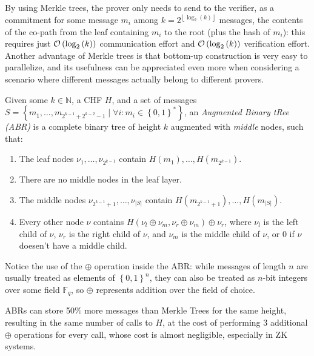 \noindent By using Merkle trees, the prover only needs to send to the verifier, as a commitment for
some message \(m_i\) among \(k = 2^{\left\lfloor\log_2(k)\right\rfloor}\) messages, the contents of
the co-path from the leaf containing \(m_i\) to the root (plus the hash of \(m_i\)): this requires
just \(\mathcal{O}\left(\log_2\left(k\right)\right)\) communication effort and
\(\mathcal{O}\left(\log_2\left(k\right)\right)\) verification effort.
Another advantage of Merkle trees is that bottom-up construction is very easy to parallelize,
and its usefulness can be appreciated even more when considering a scenario where different
messages actually belong to different provers.
\begin{definition}
	Given some \(k \in \mathbb{N}\), a CHF \(H\), and a set of messages
	\(S = \left\{m_1, \dots, m_{2^{k-1} + 2^{k-2}-1} \mid \forall i\colon m_i \in
	{\left\{0, 1\right\}}^*\right\} \),
	an \emph{Augmented Binary tRee (ABR)} is a complete binary tree of
	height \(k\) augmented with \emph{middle} nodes, such that:
	\begin{enumerate}
		\item The leaf nodes \(\nu_{1}, \dots, \nu_{2^{k-1}}\) contain \(H\left(m_1\right), \dots,
		      H\left(m_{2^{k-1}}\right)\).
		\item There are no middle nodes in the leaf layer.
		\item The middle nodes \(\nu_{2^{k-1}+1}, \dots, \nu_{\left|S\right|}\) contain
		      \(H\left(m_{2^{k-1}+1}\right), \dots, H\left(m_{\left|S\right|}\right)\).
		\item Every other node \(\nu \) contains \(H\left(\nu_l \oplus \nu_m, \nu_r \oplus
		      \nu_m\right) \oplus \nu_r \), where \(\nu_l\) is the left child of \(\nu \), \(\nu_r\)
		      is the right child of \(\nu \), and \(\nu_m\) is the middle child of \(\nu \), or \(0\)
		      if \(\nu \) doesen't have a middle child.
	\end{enumerate}
\end{definition}

\noindent Notice the use of the \(\oplus \) operation inside the ABR\@: while messages of length 
\(n\) are usually treated as elements of \({\left\{0, 1\right\}}^n\), they can also be treated as 
\(n\)-bit integers over some field \(\mathbb{F}_q\), so \(\oplus \) represents addition over the 
field of choice.

ABRs can store 50\% more messages than Merkle Trees for the same height, resulting in the same 
number of calls to \(H\), at the cost of performing 3 additional \(\oplus \) operations for
every call, whose cost is almost negligible, especially in ZK systems.
